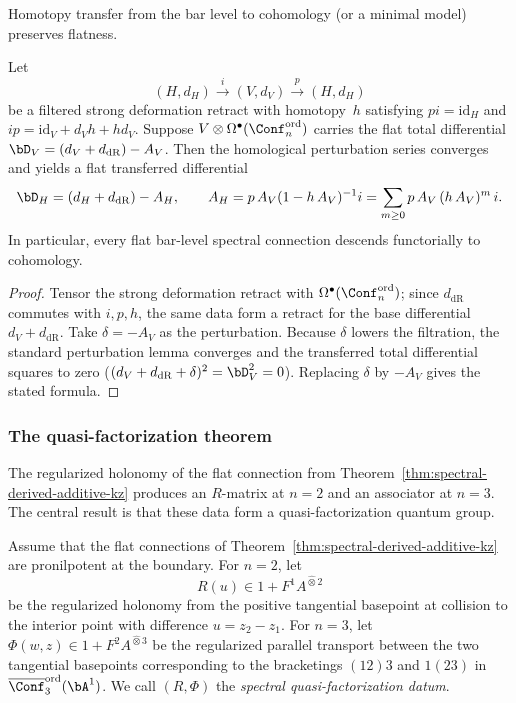Homotopy transfer from the bar level to cohomology (or a minimal
model) preserves flatness.

\begin{theorem}
\label{thm:spectral-transfer-flat}
Let
\[
 (H,d_H)
 \xrightarrow{\;i\;}
 (V,d_V)
 \xrightarrow{\;p\;}
 (H,d_H)
\]
be a filtered strong deformation retract with homotopy~$h$
satisfying $pi = \mathrm{id}_H$ and
$ip = \mathrm{id}_V + d_V h + h d_V$.
Suppose $V \otimes \Omega^\bullet(\Conf_n^{\mathrm{ord}})$
carries the flat total differential
$\bD_V = (d_V + d_{\mathrm{dR}}) - A_V$.
Then the homological perturbation series converges and yields
a flat transferred differential
\[
 \bD_H = (d_H + d_{\mathrm{dR}}) - A_H,
 \qquad
 A_H = p\,A_V(1 - h\,A_V)^{-1}i
 = \sum_{m \ge 0} p\,A_V\,(h\,A_V)^m\,i.
\]
In particular, every flat bar-level spectral connection
descends functorially to cohomology.
\end{theorem}

\begin{proof}
Tensor the strong deformation retract with
$\Omega^\bullet(\Conf_n^{\mathrm{ord}})$; since
$d_{\mathrm{dR}}$ commutes with $i,p,h$, the same data form a
retract for the base differential $d_V + d_{\mathrm{dR}}$.
Take $\delta = -A_V$ as the perturbation. Because $\delta$
lowers the filtration, the standard perturbation lemma converges
and the transferred total differential squares to zero
($(d_V + d_{\mathrm{dR}} + \delta)^2 = \bD_V^2 = 0$).
Replacing $\delta$ by $-A_V$ gives the stated formula.
\end{proof}

\subsubsection{The quasi-factorization theorem}

The regularized holonomy of the flat connection from
Theorem~\ref{thm:spectral-derived-additive-kz} produces
an $R$-matrix at $n = 2$ and an associator at $n = 3$.
The central result is that these data form a
quasi-factorization quantum group.

\begin{definition}
\label{def:regularized-holonomy-data}
Assume that the flat connections of
Theorem~\ref{thm:spectral-derived-additive-kz} are
pronilpotent at the boundary. For $n = 2$, let
\[
 R(u) \in 1 + F^1 A^{\widehat\otimes 2}
\]
be the regularized holonomy from the positive tangential
basepoint at collision to the interior point with difference
$u = z_2 - z_1$. For $n = 3$, let
$\Phi(w,z) \in 1 + F^2 A^{\widehat\otimes 3}$ be the
regularized parallel transport between the two tangential
basepoints corresponding to the bracketings $(12)3$ and
$1(23)$ in $\overline{\Conf}_3^{\mathrm{ord}}(\bA^1)$.
We call $(R,\Phi)$ the \emph{spectral quasi-factorization
datum}.
\end{definition}

